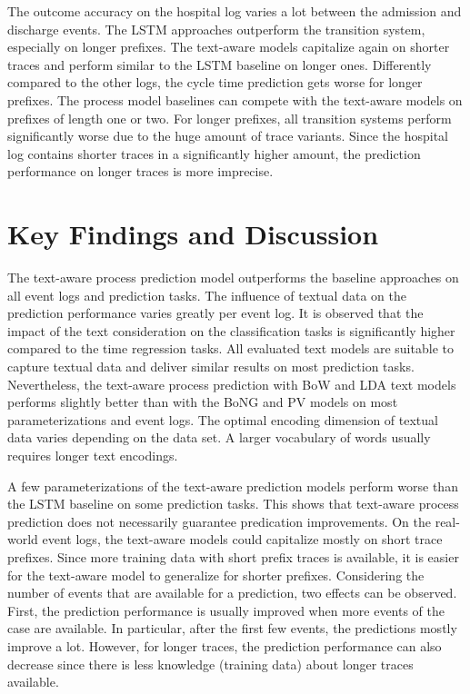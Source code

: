 The outcome accuracy on the hospital log varies a lot between the admission and discharge events.
The LSTM approaches outperform the transition system, especially on longer prefixes.
The text-aware models capitalize again on shorter traces and perform similar to the LSTM baseline on longer ones.
Differently compared to the other logs, the cycle time prediction gets worse for longer prefixes.
The process model baselines can compete with the text-aware models on prefixes of length one or two.
For longer prefixes, all transition systems perform significantly worse due to the huge amount of trace variants.
Since the hospital log contains shorter traces in a significantly higher amount, the prediction performance on longer traces is more imprecise.
 

\section{Key Findings and Discussion}

The text-aware process prediction model outperforms the baseline approaches on all event logs and prediction tasks.
The influence of textual data on the prediction performance varies greatly per event log.
It is observed that the impact of the text consideration on the classification tasks is significantly higher compared to the time regression tasks.
All evaluated text models are suitable to capture textual data and deliver similar results on most prediction tasks.
Nevertheless, the text-aware process prediction with BoW and LDA text models performs slightly better than with the BoNG and PV models on most parameterizations and event logs.
The optimal encoding dimension of textual data varies depending on the data set.
A larger vocabulary of words usually requires longer text encodings.

A few parameterizations of the text-aware prediction models perform worse than the LSTM baseline on some prediction tasks.
This shows that text-aware process prediction does not necessarily guarantee predication improvements.
On the real-world event logs, the text-aware models could capitalize mostly on short trace prefixes.
Since more training data with short prefix traces is available, it is easier for the text-aware model to generalize for shorter prefixes.
Considering the number of events that are available for a prediction, two effects can be observed.
First, the prediction performance is usually improved when more events of the case are available.
In particular, after the first few events, the predictions mostly improve a lot.
However, for longer traces, the prediction performance can also decrease since there is less knowledge (training data) about longer traces available.

